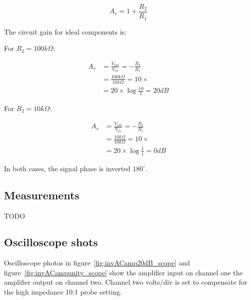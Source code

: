 \documentclass[11pt,a4paper]{article}
\begin{document}
\begin{equation}
    A_v = 1+\frac{R_2}{R_1}
\end{equation}

The circuit gain for ideal components is;

For $R_2 = 100k\Omega$:

\begin{align} 
A_v     &= \frac{V_{out}}{V_{in}} = -\frac{R_2}{R_1}\\
        &= \frac{100k\Omega}{10k\Omega} = 10\times\\
        &= 20 \times \log{\frac{10}{1}} = 20dB  
\end{align}

For $R_2 = 10k\Omega$:

\begin{align} 
A_v     &= \frac{V_{out}}{V_{in}} = -\frac{R_2}{R_1}\\
        &= \frac{10k\Omega}{10k\Omega} = 10\times\\
        &= 20 \times \log{\frac{1}{1}} = 0dB  
\end{align}

In both cases, the signal phase is inverted $180^\circ$.


\subsection{Measurements}\label{invAC-measurements-1}
TODO

\subsection{Oscilloscope shots}\label{invAC-oscilloscope-shots}
Oscilloscope photos in figure~\ref{fig:invACamp20dB_scope} and figure~\ref{fig:invACampunity_scope} show the amplifier input on channel one
the amplifier output on channel two.
Channel two volts/div is set to compensate for the high impedance 10:1 probe setting. 
\end{document}
